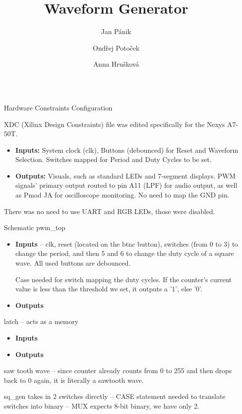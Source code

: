 \documentclass[final]{beamer}
\title{Waveform Generator}
\author{Jan Pánik \inst{1} \and Ondřej Potoček \inst{2} \and Anna Hrušková \inst{2}}
\institute[shortinst]{\inst{1} BPC2-EKT \samelineand \inst{2} BPC2-ZVUK}
\newlength{\sepwidth}
\newlength{\colwidth}
\newcommand{\separatorcolumn}{\begin{column}{\sepwidth}\end{column}}
\begin{document}
\begin{frame}[t]
\begin{columns}[t]
\separatorcolumn

\begin{column}{\colwidth}

\begin{block}{Hardware Constraints Configuration}
    
    XDC (Xilinx Design Constraints) file was edited specifically for the Nexys A7-50T.
    \begin{itemize}
      \item \textbf{Inputs:} System clock (clk), Buttons (debounced) for Reset and Waveform Selection. Switches mapped for Period and Duty Cycles to be set.
      \item \textbf{Outputs:} Visuals, such as standard LEDs and 7-segment displays. PWM signals' primary output routed to pin A11 (LPF) for audio output, as well as Pmod JA for oscilloscope monitoring. No need to map the GND pin.
    \end{itemize}
    There was no need to use UART and RGB LEDs, those were disabled. 

  \end{block}

  \begin{alertblock}{Schematic}
    pwm\_top
    \begin{itemize}
    \item \textbf{Inputs} -- clk, reset (located on the btnc button), switches (from 0 to 3) to change the period, and then 5 and 6 to change the duty cycle of a square wave. All used buttons are debounced.
    
    Case needed for switch mapping the duty cycles. If the counter's current value is less than the threshold we set, it outputs a '1', else '0'.

    \item \textbf{Outputs} 
    \end{itemize}
    
    latch -- acts as a memory
    \begin{itemize}
    \item \textbf{Inputs}
    \item \textbf{Outputs} 
    \end{itemize}
    
      saw tooth wave -- since counter already counts from 0 to 255 and then drops back to 0 again, it is literally a sawtooth wave.

      sq\_gen takes in 2 switches directly -- CASE statement needed to translate switches into binary -- MUX expects 8-bit binary, we have only 2.
    

\end{alertblock}
\end{column}
\end{columns}
\end{frame}
\end{document}
